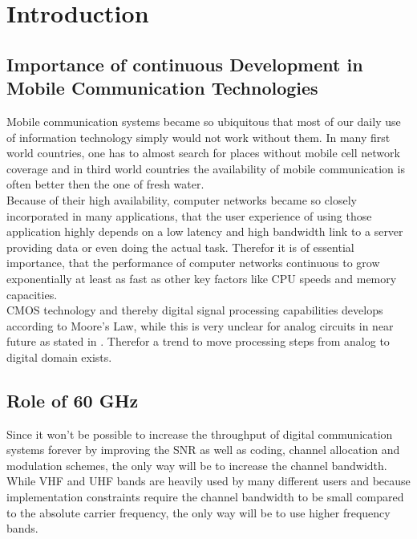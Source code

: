 \chapter{Introduction}
\label{ch:introduction}

\section{Importance of continuous Development in
  Mobile Communication Technologies}

Mobile communication systems became so ubiquitous that most of our daily
use of information technology simply would not work without them.
In many first world countries, one has to almost search for places without
mobile cell network coverage and in third world countries the availability of
mobile communication is often better then the one of fresh water. \\

Because of their high availability, computer networks became so closely
incorporated in many applications, that the user experience of using those
application highly depends on a low latency and high bandwidth link
to a server providing data or even doing the actual task.
Therefor it is of essential importance, that
the performance of computer networks continuous \cite{web_content_delivery}
to grow exponentially at least as fast as other key factors like
\gls{CPU} speeds and memory capacities. \\

\acrshort{CMOS} technology and thereby digital signal processing capabilities
develops according to Moore's Law, while this is very unclear for analog
circuits in near future as stated in \cite{belgium}.
Therefor a trend to move processing steps from analog to digital
domain exists. \\

\section{Role of 60 GHz}
Since it won't be possible to increase the throughput of digital communication
systems forever by improving the \gls{SNR} as well as coding, channel allocation
and modulation schemes, the only way will be to increase the channel bandwidth.
While \gls{VHF} and \gls{UHF} bands are heavily used by many different
users and because implementation constraints require the channel
bandwidth to be small compared to the absolute carrier frequency,
the only way will be to use higher frequency bands. \\

